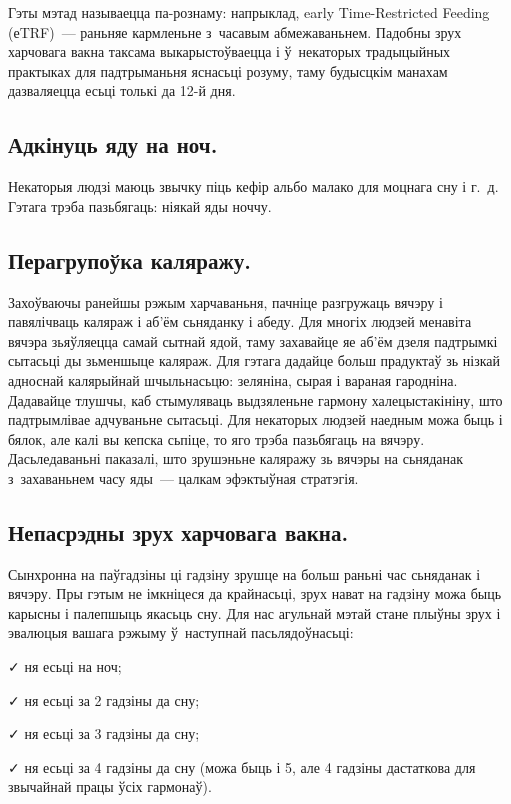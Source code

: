 Гэты мэтад называецца па-рознаму: напрыклад, early Time-Restricted Feeding (еTRF)~--- раньняе кармленьне з~часавым абмежаваньнем. Падобны зрух харчовага вакна таксама выкарыстоўваецца і ў~некаторых традыцыйных практыках для падтрыманьня яснасьці розуму, таму будысцкім манахам дазваляецца есьці толькі да 12-й дня.

\subsection{Адкінуць яду на ноч.}
Некаторыя людзі маюць звычку піць кефір альбо малако для моцнага сну і г.~д. Гэтага трэба пазьбягаць: ніякай яды ноччу.

\subsection{Перагрупоўка каляражу.}
Захоўваючы ранейшы рэжым харчаваньня, пачніце разгружаць вячэру і павялічваць каляраж і аб'ём сьняданку і абеду. Для многіх людзей менавіта вячэра зьяўляецца самай сытнай ядой, таму захавайце яе аб'ём дзеля падтрымкі сытасьці ды зьменшыце каляраж. Для гэтага дадайце больш прадуктаў зь нізкай адноснай калярыйнай шчыльнасьцю: зеляніна, сырая і вараная гародніна. Дадавайце тлушчы, каб стымуляваць выдзяленьне гармону халецыстакініну, што падтрымлівае адчуваньне сытасьці. Для некаторых людзей наедным можа быць і бялок, але калі вы кепска сьпіце, то яго трэба пазьбягаць на вячэру. Дасьледаваньні паказалі, што зрушэньне каляражу зь вячэры на сьняданак з~захаваньнем часу яды~--- цалкам эфэктыўная стратэгія.

\subsection{Непасрэдны зрух харчовага вакна.}
Сынхронна на паўгадзіны ці гадзіну зрушце на больш раньні час сьняданак і вячэру. Пры гэтым не імкніцеся да крайнасьці, зрух нават на гадзіну можа быць карысны і палепшыць якасьць сну. Для нас агульнай мэтай стане плыўны зрух і эвалюцыя вашага рэжыму ў~наступнай пасьлядоўнасьці:

✓ ня есьці на ноч;

✓ ня есьці за 2 гадзіны да сну;

✓ ня есьці за 3 гадзіны да сну;

✓ ня есьці за 4 гадзіны да сну (можа быць і 5, але 4 гадзіны дастаткова для звычайнай працы ўсіх гармонаў).

